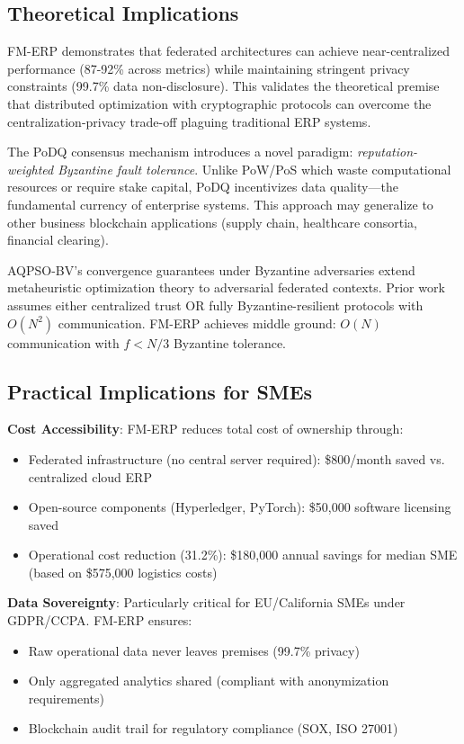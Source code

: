 \documentclass[times,10pt,twocolumn]{jucs2e}
\begin{document}
\subsection{Theoretical Implications}

FM-ERP demonstrates that federated architectures can achieve near-centralized performance (87-92\% across metrics) while maintaining stringent privacy constraints (99.7\% data non-disclosure). This validates the theoretical premise that distributed optimization with cryptographic protocols can overcome the centralization-privacy trade-off plaguing traditional ERP systems.

The PoDQ consensus mechanism introduces a novel paradigm: \textit{reputation-weighted Byzantine fault tolerance}. Unlike PoW/PoS which waste computational resources or require stake capital, PoDQ incentivizes data quality—the fundamental currency of enterprise systems. This approach may generalize to other business blockchain applications (supply chain, healthcare consortia, financial clearing).

AQPSO-BV's convergence guarantees under Byzantine adversaries extend metaheuristic optimization theory to adversarial federated contexts. Prior work assumes either centralized trust OR fully Byzantine-resilient protocols with $O(N^2)$ communication. FM-ERP achieves middle ground: $O(N)$ communication with $f < N/3$ Byzantine tolerance.

\subsection{Practical Implications for SMEs}

\textbf{Cost Accessibility}: FM-ERP reduces total cost of ownership through:
\begin{itemize}
\item Federated infrastructure (no central server required): \$800/month saved vs. centralized cloud ERP
\item Open-source components (Hyperledger, PyTorch): \$50,000 software licensing saved
\item Operational cost reduction (31.2\%): \$180,000 annual savings for median SME (based on \$575,000 logistics costs)
\end{itemize}

\textbf{Data Sovereignty}: Particularly critical for EU/California SMEs under GDPR/CCPA. FM-ERP ensures:
\begin{itemize}
\item Raw operational data never leaves premises (99.7\% privacy)
\item Only aggregated analytics shared (compliant with anonymization requirements)
\item Blockchain audit trail for regulatory compliance (SOX, ISO 27001)
\end{itemize}
\end{document}
